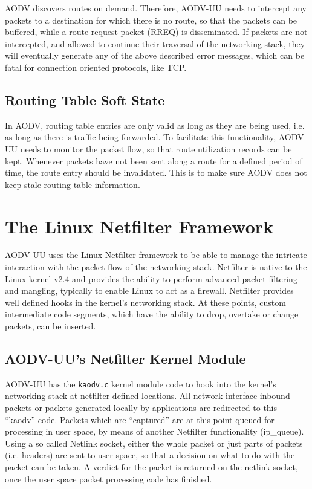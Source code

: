 \documentclass[swedish,10pt,twocolumn]{article}
\begin{document}
AODV discovers routes on demand. Therefore, AODV-UU needs to intercept
any packets to a destination for which there is no route, so that the
packets can be buffered, while a route request packet (RREQ) is
disseminated. If packets are not intercepted, and allowed to continue
their traversal of the networking stack, they will eventually generate
any of the above described error messages, which can be fatal for
connection oriented protocols, like TCP.

\subsection{Routing Table Soft State}

In AODV, routing table entries are only valid as long as they are being used,
i.e. as long as there is traffic being forwarded. To facilitate this
functionality, AODV-UU needs to monitor the packet flow, so that route
utilization records can be kept. Whenever packets have not been sent
along a route for a defined period of time, the route entry should be
invalidated. This is to make sure AODV does not keep stale routing
table information.

\section{The Linux Netfilter Framework}

AODV-UU uses the Linux Netfilter framework to be able to manage the
intricate interaction with the packet flow of the networking
stack. Netfilter is native to the Linux kernel v2.4 and provides the
ability to perform advanced packet filtering and mangling, typically
to enable Linux to act as a firewall. Netfilter provides well defined
hooks in the kernel's networking stack. At these points, custom
intermediate code segments, which have the ability to drop, overtake
or change packets, can be inserted. 

\subsection{AODV-UU's Netfilter Kernel Module}

AODV-UU has the {\tt kaodv.c} kernel module code to hook into the
kernel's networking stack at netfilter defined locations. All network
interface inbound packets or packets generated locally by applications
are redirected to this ``kaodv'' code. Packets which are ``captured''
are at this point queued for processing in user space, by means of
another Netfilter functionality (ip\_queue). Using a so called Netlink
socket, either the whole packet or just parts of packets
(i.e. headers) are sent to user space, so that a decision on what to
do with the packet can be taken. A verdict for the packet is returned
on the netlink socket, once the user space packet processing code has
finished.
\end{document}
